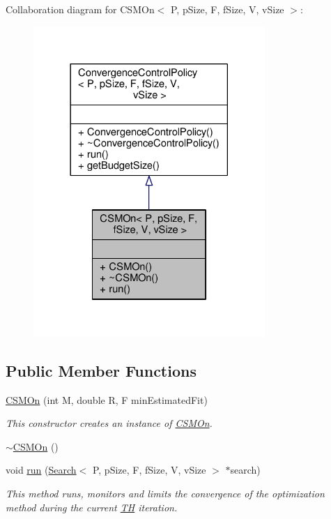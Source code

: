 Collaboration diagram for C\+S\+M\+On$<$ P, p\+Size, F, f\+Size, V, v\+Size $>$\+:
\nopagebreak
\begin{figure}[H]
\begin{center}
\leavevmode
\includegraphics[width=249pt]{classCSMOn__coll__graph}
\end{center}
\end{figure}
\subsection*{Public Member Functions}
\begin{DoxyCompactItemize}
\item 
\hyperlink{classCSMOn_aacd95cee8b48fc2d51120fbf7d2fd546}{C\+S\+M\+On} (int M, double R, F min\+Estimated\+Fit)
\begin{DoxyCompactList}\small\item\em This constructor creates an instance of \hyperlink{classCSMOn}{C\+S\+M\+On}. \end{DoxyCompactList}\item 
\hyperlink{classCSMOn_af77e878e14c14200a4e95457e611162b}{$\sim$\+C\+S\+M\+On} ()
\item 
void \hyperlink{classCSMOn_a430398bc3e096631f8cd180ee1877616}{run} (\hyperlink{classSearch}{Search}$<$ P, p\+Size, F, f\+Size, V, v\+Size $>$ $\ast$search)
\begin{DoxyCompactList}\small\item\em This method runs, monitors and limits the convergence of the optimization method during the current \hyperlink{classTH}{TH} iteration. \end{DoxyCompactList}\end{DoxyCompactItemize}


